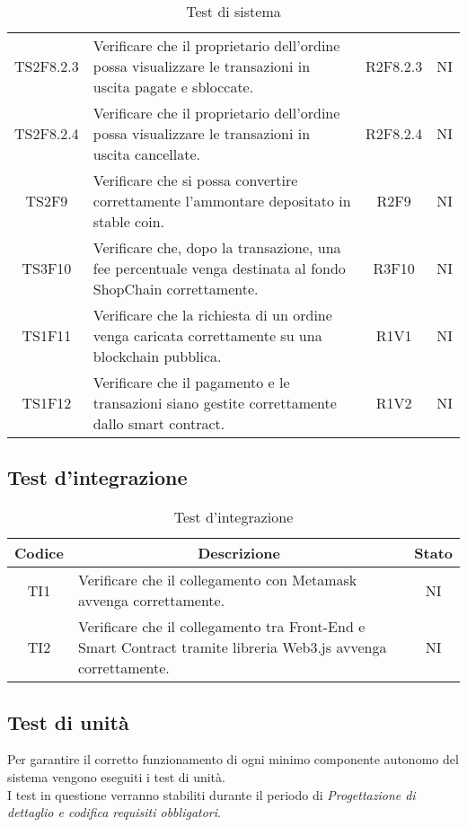 \begin{table}[H]
\begin{tabular}{c|p{8cm}|c|c}
    TS2F8.2.3 &	Verificare che il proprietario dell'ordine possa visualizzare le transazioni in uscita pagate e sbloccate. & R2F8.2.3 &	NI \\
    TS2F8.2.4 &	Verificare che il proprietario dell'ordine possa visualizzare le transazioni in uscita cancellate. &	R2F8.2.4 &	NI \\
    TS2F9 &	Verificare che si possa convertire correttamente l'ammontare depositato in stable coin. &	R2F9 &	NI \\
    TS3F10 &	Verificare che, dopo la transazione, una fee percentuale venga destinata al fondo ShopChain correttamente. & R3F10 &	NI \\
    TS1F11 &	Verificare che la richiesta di un ordine venga caricata correttamente su una blockchain pubblica. &	R1V1 &	NI \\
    TS1F12 &	Verificare che il pagamento e le transazioni siano gestite correttamente dallo smart contract. &	R1V2 &	NI \\
  \end{tabular}
  \caption{Test di sistema}
\end{table}

\subsection{Test d'integrazione}\label{subsection:test_integrazione}
\begin{table}[H]
  \centering
  \renewcommand{\arraystretch}{1.8}
  \begin{tabular}{c|p{8cm}|c}
    \rowcolor[HTML]{125E28}
    \color[HTML]{FFFFFF}\textbf{Codice}
    & \multicolumn{1}{c}{\color[HTML]{FFFFFF}\textbf{Descrizione}}
    & \color[HTML]{FFFFFF}\textbf{Stato}\\
    \hline
    TI1 & Verificare che il collegamento con Metamask avvenga correttamente. & NI \\
    TI2 & Verificare che il collegamento tra Front-End\glo{} e Smart Contract tramite libreria Web3.js avvenga correttamente. & NI \\
  \end{tabular}
  \caption{Test d'integrazione}
\end{table}

\subsection{Test di unità}\label{subsection:test_unita}
Per garantire il corretto funzionamento di ogni minimo componente autonomo del sistema vengono eseguiti i test di unità. \\
I test in questione verranno stabiliti durante il periodo di \textit{Progettazione di dettaglio e codifica requisiti obbligatori}.
